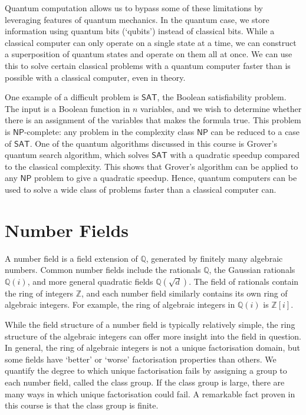 Quantum computation allows us to bypass some of these limitations by leveraging features of quantum mechanics.
In the quantum case, we store information using quantum bits (`qubits') instead of classical bits.
While a classical computer can only operate on a single state at a time, we can construct a superposition of quantum states and operate on them all at once.
We can use this to solve certain classical problems with a quantum computer faster than is possible with a classical computer, even in theory.

One example of a difficult problem is \( \mathsf{SAT} \), the Boolean satisfiability problem.
The input is a Boolean function in \( n \) variables, and we wish to determine whether there is an assignment of the variables that makes the formula true.
This problem is \( \mathsf{NP} \)-complete: any problem in the complexity class \( \mathsf{NP} \) can be reduced to a case of \( \mathsf{SAT} \).
One of the quantum algorithms discussed in this course is Grover's quantum search algorithm, which solves \( \mathsf{SAT} \) with a quadratic speedup compared to the classical complexity.
This shows that Grover's algorithm can be applied to any \( \mathsf{NP} \) problem to give a quadratic speedup.
Hence, quantum computers can be used to solve a wide class of problems faster than a classical computer can.



\chapter{Number Fields}
A number field is a field extension of \( \mathbb Q \), generated by finitely many algebraic numbers.
Common number fields include the rationals \( \mathbb Q \), the Gaussian rationals \( \mathbb Q(i) \), and more general quadratic fields \( \mathbb Q(\sqrt{d}) \).
The field of rationals contain the ring of integers \( \mathbb Z \), and each number field similarly contains its own ring of algebraic integers.
For example, the ring of algebraic integers in \( \mathbb Q(i) \) is \( \mathbb Z[i] \).

While the field structure of a number field is typically relatively simple, the ring structure of the algebraic integers can offer more insight into the field in question.
In general, the ring of algebraic integers is not a unique factorisation domain, but some fields have `better' or `worse' factorisation properties than others.
We quantify the degree to which unique factorisation fails by assigning a group to each number field, called the class group.
If the class group is large, there are many ways in which unique factorisation could fail.
A remarkable fact proven in this course is that the class group is finite.


